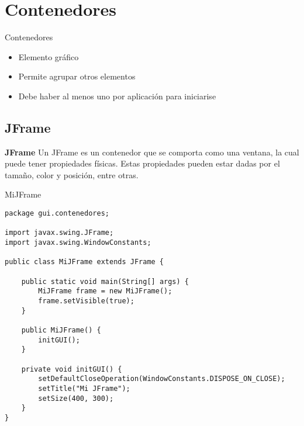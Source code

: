 \documentclass[11pt]{beamer}
\begin{document}
\section{Contenedores}
\begin{frame}{Contenedores}
\begin{itemize}
\item Elemento gráfico
\item Permite agrupar otros elementos
\item Debe haber al menos uno por aplicación para iniciarise
\end{itemize}
\end{frame}

\subsection{JFrame}
\begin{frame}{\textbf{JFrame}}
Un JFrame es un contenedor que se comporta como una ventana, la cual puede tener propiedades físicas. Estas propiedades pueden estar dadas por el tamaño, color y posición, entre otras.
\end{frame}

\begin{frame}[fragile]{MiJFrame}
\begin{tiny}

\begin{lstlisting}
package gui.contenedores;

import javax.swing.JFrame;
import javax.swing.WindowConstants;

public class MiJFrame extends JFrame {

    public static void main(String[] args) {
        MiJFrame frame = new MiJFrame();
        frame.setVisible(true);
    }

    public MiJFrame() {
        initGUI();
    }

    private void initGUI() {
        setDefaultCloseOperation(WindowConstants.DISPOSE_ON_CLOSE);
        setTitle("Mi JFrame");
        setSize(400, 300);
    }
}

\end{lstlisting}
\end{tiny}
\end{frame}
\end{document}
